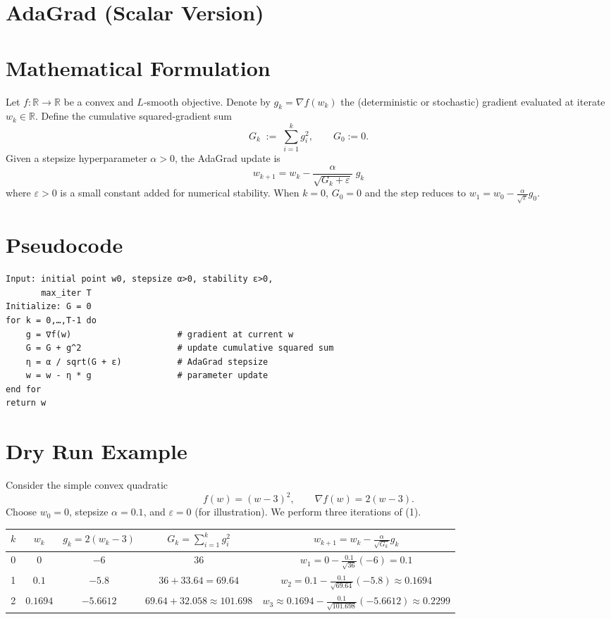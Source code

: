 \documentclass{article}
\begin{document}
\section*{AdaGrad (Scalar Version)}

\section*{Mathematical Formulation}
Let $f:\mathbb{R}\rightarrow\mathbb{R}$ be a convex and $L$‑smooth objective.  
Denote by $g_k=\nabla f(w_k)$ the (deterministic or stochastic) gradient evaluated at iterate $w_k\in\mathbb{R}$.  
Define the cumulative squared‑gradient sum
\[
G_k \;:=\;\sum_{i=1}^{k} g_i^{2},\qquad G_0:=0 .
\]
Given a stepsize hyperparameter $\alpha>0$, the AdaGrad update is
\[
\boxed{ \; w_{k+1}= w_{k}-\frac{\alpha}{\sqrt{G_k+\varepsilon}}\;g_k\; } \tag{1}
\]
where $\varepsilon>0$ is a small constant added for numerical stability.  
When $k=0$, $G_0=0$ and the step reduces to $w_{1}=w_{0}-\frac{\alpha}{\sqrt{\varepsilon}}g_{0}$.

\section*{Pseudocode}
\begin{verbatim}
Input: initial point w0, stepsize α>0, stability ε>0,
       max_iter T
Initialize: G = 0
for k = 0,…,T-1 do
    g = ∇f(w)                     # gradient at current w
    G = G + g^2                   # update cumulative squared sum
    η = α / sqrt(G + ε)           # AdaGrad stepsize
    w = w - η * g                 # parameter update
end for
return w
\end{verbatim}

\section*{Dry Run Example}
Consider the simple convex quadratic
\[
f(w)=(w-3)^2 ,\qquad \nabla f(w)=2(w-3).
\]
Choose $w_0=0$, stepsize $\alpha=0.1$, and $\varepsilon=0$ (for illustration).  
We perform three iterations of (1).

\begin{center}
\begin{tabular}{c|c|c|c|c}
$k$ & $w_k$ & $g_k=2(w_k-3)$ & $G_k=\sum_{i=1}^{k}g_i^{2}$ & $w_{k+1}=w_k-\frac{\alpha}{\sqrt{G_k}}g_k$\\
\hline
0 & $0$ & $-6$ & $36$ & $w_1=0-\frac{0.1}{\sqrt{36}}(-6)=0.1$\\[4pt]
1 & $0.1$ & $-5.8$ & $36+33.64=69.64$ & $w_2=0.1-\frac{0.1}{\sqrt{69.64}}(-5.8)\approx0.1694$\\[4pt]
2 & $0.1694$ & $-5.6612$ & $69.64+32.058\approx101.698$ &
$w_3\approx0.1694-\frac{0.1}{\sqrt{101.698}}(-5.6612)\approx0.2299$
\end{tabular}
\end{center}
\end{document}
